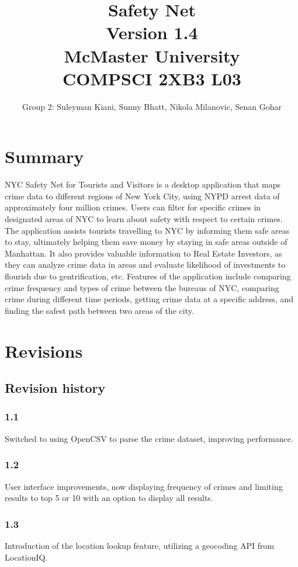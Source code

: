 \documentclass[12pt]{article}
\title{\huge{Safety Net} \\ \vspace{3mm} \large{Version 1.4} \\ \vspace{3mm} McMaster University \\ COMPSCI 2XB3 L03}
\author{Group 2: Suleyman Kiani, Sunny Bhatt, Nikola Milanovic, Senan Gohar} \date{}
\begin{document}
\maketitle
\vspace{5mm}
\section*{Summary}
NYC Safety Net for Tourists and Visitors is a desktop application that maps crime data to
different regions of New York City, using NYPD arrest data of approximately four million crimes. Users can filter
for specific crimes in designated areas of NYC to learn about safety with respect to certain crimes. The
application assists tourists travelling to NYC by informing them safe areas to stay, ultimately helping them
save money by staying in safe areas outside of Manhattan. It also provides valuable information to Real Estate
Investors, as they can analyze crime data in areas and evaluate likelihood of investments to flourish due
to gentrification, etc. Features of the application include comparing crime frequency and types of crime
between the bureaus of NYC, comparing crime during different time periods, getting crime data at
a specific address, and finding the safest path between two areas of the city.

\newpage

\section* {Revisions}
\subsection*{Revision history}
\subsubsection*{1.1}
Switched to using OpenCSV to parse the crime dataset, improving performance.
\subsubsection*{1.2}
User interface improvements, now displaying frequency of crimes and limiting results to top 5 or 10 with an option to display all results.
\subsubsection*{1.3}
Introduction of the location lookup feature, utilizing a geocoding API from LocationIQ.
\end{document}
